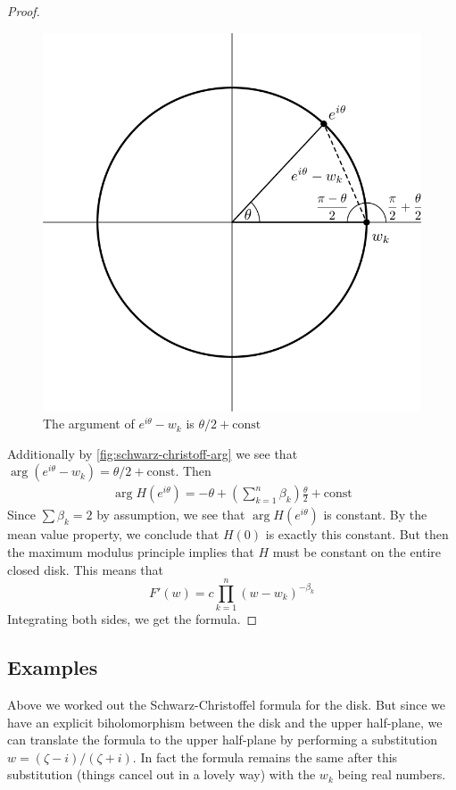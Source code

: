 \begin{proof}
    \begin{figure}[ht]
        \centering
        \includegraphics[scale=0.9]{Images/schwarz_christoff_arg.png}
        \caption{The argument of $e^{i \theta} - w_k$ is $\theta/2 + \text{const}$}
        \label{fig:schwarz-christoff-arg}
    \end{figure}

    Additionally by \autoref{fig:schwarz-christoff-arg} we see that $\arg(e^{i \theta} - w_k) = \theta/2 + \text{const}$. Then 
    \begin{align*}
        \arg H(e^{i \theta}) = - \theta + \left(\sum_{k = 1}^n \beta_k \right) \frac{\theta}{2} + \text{const}
    \end{align*}
    Since $\sum \beta_k = 2$ by assumption, we see that $\arg H(e^{i \theta})$ is constant. By the mean value property, we conclude that $H(0)$ is exactly this constant. But then the maximum modulus principle implies that $H$ must be constant on the entire closed disk. This means that 
    $$F'(w) = c \prod_{k = 1}^n (w - w_k)^{-\beta_k}$$
    Integrating both sides, we get the formula.
\end{proof}

\subsection{Examples}
Above we worked out the Schwarz-Christoffel formula for the disk. But since we have an explicit biholomorphism between the disk and the upper half-plane, we can translate the formula to the upper half-plane by performing a substitution $w = (\zeta - i)/(\zeta + i)$. In fact the formula remains the same after this substitution (things cancel out in a lovely way) with the $w_k$ being real numbers. 

